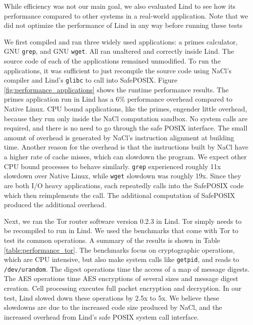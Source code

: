 {While efficiency was not our main goal, we also evaluated Lind to see
how its performance compared to other systems in a real-world application.
Note that we did not optimize the performance of Lind in any way before running
these tests

We first compiled and ran three widely used applications:
a primes calculator, GNU \texttt{grep}, and GNU \texttt{wget}. All ran unaltered and
correctly inside Lind. The source code of each of the applications remained
unmodified. To run the applications, it was sufficient to just recompile the
source code using NaCl's compiler and Lind's \texttt{glibc} to call
into SafePOSIX.
Figure \ref{fig:performance_applications} shows the runtime performance
results.
The primes application run in Lind has a 6\% performance overhead compared to
Native Linux. CPU bound applications, like the primes, engender little overhead,
because they run only inside the NaCl computation sandbox. No system calls are required,
and there is no need to go through the safe POSIX interface. The small amount of overhead
is generated by NaCl's instruction alignment at building time. Another reason for the overhead
is that the instructions built by NaCl have a higher rate of cache misses, which can slowdown the
program.
We expect other CPU bound processes to behave similarly.
\texttt{grep} experienced roughly 11x slowdown over Native Linux, while \texttt{wget}
slowdown was roughly 19x. Since they are both I/O heavy applications,
each repeatedly calls into the SafePOSIX code which then reimplements
the call.  The additional computation of SafePOSIX produced the additional
overhead. 

Next, we ran the Tor router software version 0.2.3 in Lind. Tor simply
needs to be recompiled to run in Lind.
We used the benchmarks that come with Tor to test its common operations.
A summary of the results is shown in Table \ref{table:performance_tor}. The
benchmarks focus on cryptographic operations,
which are CPU intensive, but also make system calls like \texttt{getpid}, and reads to
\texttt{/dev/urandom}.
The digest operations time the access of a map of message digests.
The AES operations time AES encryptions of several sizes and message
digest creation.
Cell processing executes full packet encryption and decryption. In our
test, Lind slowed down these operations by 2.5x to 5x. We believe these
slowdowns are due to the increased code size produced by NaCl,
and the
increased overhead from Lind's safe POSIX system call interface.

}
